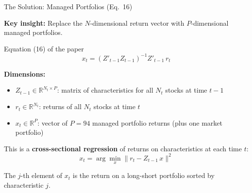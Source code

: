 \documentclass[aspectratio=169]{beamer}
\newcommand{\R}{\mathbb{R}}
\begin{document}
%
%
\begin{frame}{The Solution: Managed Portfolios (Eq.\ 16)}

\textbf{Key insight:} Replace the $N$-dimensional return vector with $P$-dimensional managed portfolios.

\begin{block}{Equation (16) of the paper}
\vspace{-0.5em}
\[
\boxed{x_t = (Z'_{t-1} Z_{t-1})^{-1} Z'_{t-1}\, r_t}
\]
\end{block}

\vspace{0.3em}
\textbf{Dimensions:}
\begin{itemize}
    \item $Z_{t-1} \in \R^{N_t \times P}$: matrix of characteristics for all $N_t$ stocks at time $t-1$
    \item $r_t \in \R^{N_t}$: returns of all $N_t$ stocks at time $t$
    \item $x_t \in \R^{P}$: vector of $P = 94$ managed portfolio returns (plus one market portfolio)
\end{itemize}

\vspace{0.3em}
This is a \textbf{cross-sectional regression} of returns on characteristics at each time $t$:
\[
x_t = \arg\min_{x} \| r_t - Z_{t-1}\, x \|^2
\]

The $j$-th element of $x_t$ is the return on a long-short portfolio sorted by characteristic $j$.
\end{frame}
%
%
\end{document}
